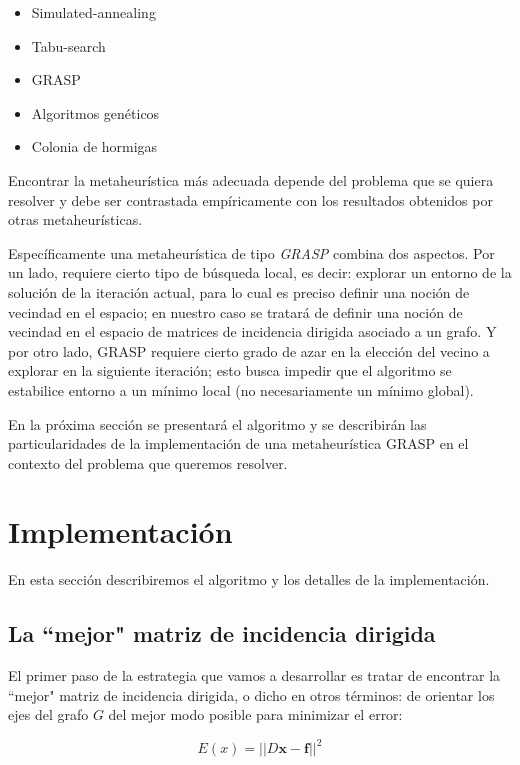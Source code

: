 \documentclass[10pt, a4paper, twocolumn]{article} %
\begin{document}
\begin{itemize}
	\item Simulated-annealing
	\item Tabu-search
	\item GRASP
	\item Algoritmos genéticos
	\item Colonia de hormigas
\end{itemize}

Encontrar la metaheurística más adecuada depende del problema que se 
quiera resolver y debe ser contrastada empíricamente con los resultados 
obtenidos por otras metaheurísticas.

\smallskip

Específicamente una metaheurística de tipo \textit{GRASP} combina dos 
aspectos. Por un lado, requiere cierto tipo de búsqueda local, es decir: 
explorar un entorno de la solución de la iteración actual, para lo cual 
es preciso definir una noción de vecindad en el espacio; en nuestro caso 
se tratará de definir una noción de vecindad en el espacio de matrices 
de incidencia dirigida asociado a un grafo. Y por otro lado, GRASP 
requiere cierto grado de azar en la elección del vecino a explorar en 
la siguiente iteración; esto busca impedir que el algoritmo se 
estabilice entorno a un mínimo local (no necesariamente un mínimo 
global). 

\smallskip

En la próxima sección se presentará el algoritmo y se describirán las 
particularidades de la implementación de una metaheurística GRASP en el 
contexto del problema que queremos resolver.

\section{Implementación}

En esta sección describiremos el algoritmo y los detalles de la 
implementación.

\subsection{La ``mejor" matriz de incidencia dirigida}

El primer paso de la estrategia que vamos a desarrollar es tratar de 
encontrar la ``mejor" matriz de incidencia dirigida, o dicho en otros 
términos: de orientar los ejes del grafo $G$ del mejor modo posible para 
minimizar el error:

$$E(x) = ||D\bm{x}-\bm{f}||^2$$
 
\end{document}
